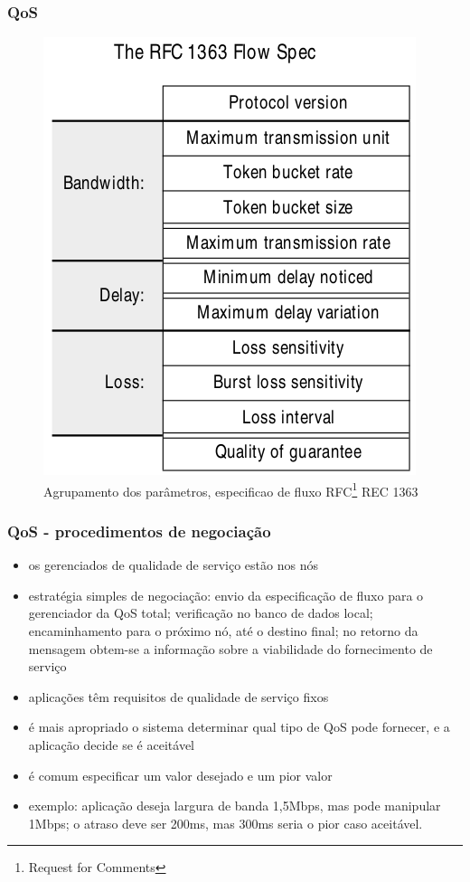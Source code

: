 \documentclass[]{beamer}
\begin{document}
\begin{frame}
  \frametitle{QoS}
  \begin{figure}[hbtp]
   \caption{Agrupamento dos parâmetros, especificao de 
fluxo RFC\footnote{Request for Comments} REC 1363}
   \begin{center}
    \includegraphics[scale=0.26]{rfc1363.png}
   \end{center}
  \end{figure}

\end{frame}

\begin{frame}
  \frametitle{QoS - procedimentos de negociação}
\begin{itemize}
  \item os gerenciados de qualidade de serviço estão nos nós
  \item estratégia simples de negociação: envio da especificação de fluxo para o gerenciador
da QoS total; verificação no banco de dados local; encaminhamento para o próximo nó, até
 o destino final; no retorno da mensagem obtem-se a informação sobre a 
viabilidade do fornecimento de serviço
  \item aplicações têm requisitos de qualidade de serviço fixos
  \item é mais apropriado o sistema determinar qual tipo de QoS pode fornecer, e a aplicação
decide se é aceitável
  \item é comum especificar um valor desejado e um pior valor
  \item exemplo: aplicação deseja largura de banda 1,5Mbps, mas pode manipular 1Mbps; o atraso
deve ser 200ms, mas 300ms seria o pior caso aceitável.
\end{itemize}
\end{frame}
\end{document}
